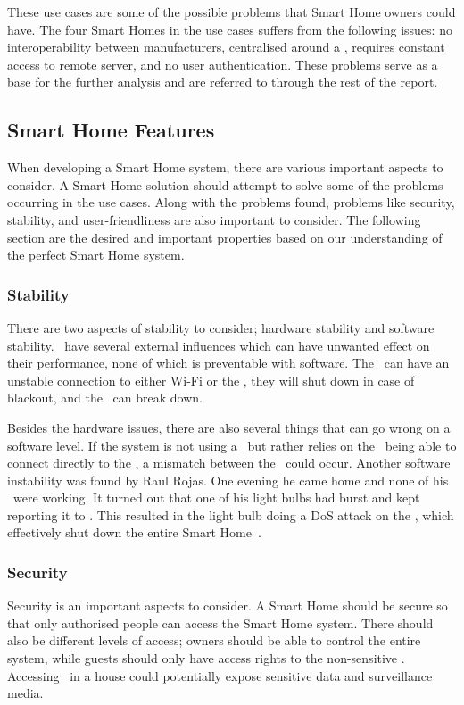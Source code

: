 These use cases are some of the possible problems that Smart Home owners could have. The four Smart Homes in the use cases suffers from the following issues: no interoperability between manufacturers, centralised around a \hub, requires constant access to remote server, and no user authentication. These problems serve as a base for the further analysis and are referred to through the rest of the report.

\subsection{Smart Home Features} \label{sec:smart-home-features}
When developing a Smart Home system, there are various important aspects to consider. A Smart Home solution should attempt to solve some of the problems occurring in the use cases. Along with the problems found, problems like security, stability, and user-friendliness are also important to consider. The following section are the desired and important properties based on our understanding of the perfect Smart Home system. 

\subsubsection{Stability}
There are two aspects of stability to consider; hardware stability and software stability. \Sdevs~have several external influences which can have unwanted effect on their performance, none of which is preventable with software. The \sdevs~can have an unstable connection to either Wi-Fi or the \hub, they will shut down in case of blackout, and the \hub~can break down. 

Besides the hardware issues, there are also several things that can go wrong on a software level. If the system is not using a \hub~but rather relies on the \phones~being able to connect directly to the \sdevs, a mismatch between the \phones~could occur. Another software instability was found by Raul Rojas. One evening he came home and none of his \sdevs~were working. It turned out that one of his light bulbs had burst and kept reporting it to \hub. This resulted in the light bulb doing a DoS attack on the \hub, which effectively shut down the entire Smart Home~\citep{self-dos-smart-house}.


\subsubsection{Security}
Security is an important aspects to consider. A Smart Home should be secure so that only authorised people can access the Smart Home system. There should also be different levels of access; owners should be able to control the entire system, while guests should only have access rights to the non-sensitive \sdevs. Accessing \sdevs~in a house could potentially expose sensitive data and surveillance media.

